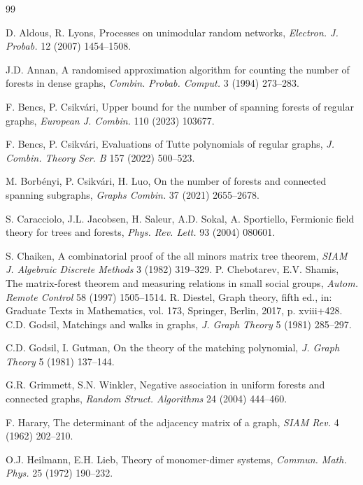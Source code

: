 \documentclass[11pt, a4paper]{article}
\begin{document}
\begin{thebibliography}{99}

D. Aldous, R. Lyons, Processes on unimodular random networks,  {\em Electron. J. Probab. } 12 (2007) 1454--1508.

J.D. Annan, A randomised approximation algorithm for counting the number of forests in dense graphs,  {\em Combin. Probab. Comput. } 3 (1994) 273--283.

F. Bencs, P. Csikv\'ari, Upper bound for the number of spanning forests of regular graphs,  {\em European J. Combin. } 110 (2023) 103677.

F. Bencs, P. Csikv\'ari, Evaluations of Tutte polynomials of regular graphs, {\em J. Combin. Theory Ser. B} 157 (2022) 500--523.


M. Borb\'enyi, P. Csikv\'ari, H. Luo, On the number of forests and connected spanning subgraphs,  {\em Graphs Combin. } 37 (2021) 2655--2678.

S. Caracciolo, J.L. Jacobsen, H. Saleur, A.D. Sokal, A. Sportiello, Fermionic field theory for trees and forests,  {\em Phys. Rev. Lett. } 93 (2004) 080601.

S. Chaiken, A combinatorial proof of the all minors matrix tree theorem,  {\em SIAM J. Algebraic Discrete Methods} 3 (1982) 319--329.
P.  Chebotarev, E.V. Shamis, The matrix-forest theorem and measuring relations in small social groups,  {\em Autom. Remote Control} 58 (1997) 1505--1514.
R. Diestel, Graph theory, fifth ed., in: Graduate Texts in Mathematics, vol. 173, Springer, Berlin, 2017, p. xviii+428.
C.D. Godsil, Matchings and walks in graphs,  {\em J. Graph Theory} 5 (1981) 285--297.

C.D. Godsil, I. Gutman, On the theory of the matching polynomial,  {\em J. Graph Theory} 5 (1981) 137--144.

G.R. Grimmett, S.N. Winkler, Negative association in uniform forests and connected graphs,  {\em Random Struct. Algorithms} 24 (2004) 444--460.

F. Harary, The determinant of the adjacency matrix of a graph,  {\em SIAM Rev. } 4 (1962) 202--210.

O.J. Heilmann, E.H. Lieb, Theory of monomer-dimer systems,  {\em Commun. Math. Phys. } 25 (1972) 190--232.


\end{thebibliography}
\end{document}

